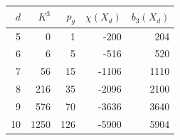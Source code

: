 \begin{center}
\begin{tabular}{@{}rrrrr@{}}
\toprule
$d$ & $K^3$ & $p_g$ & $\chi(X_d)$ & $b_3(X_d)$\\
\midrule
5 & 0 & 1 & -200 & 204\\
6 & 6 & 5 & -516 & 520\\
7 & 56 & 15 & -1106 & 1110\\
8 & 216 & 35 & -2096 & 2100\\
9 & 576 & 70 & -3636 & 3640\\
10 & 1250 & 126 & -5900 & 5904\\
\bottomrule
\end{tabular}
\end{center}
